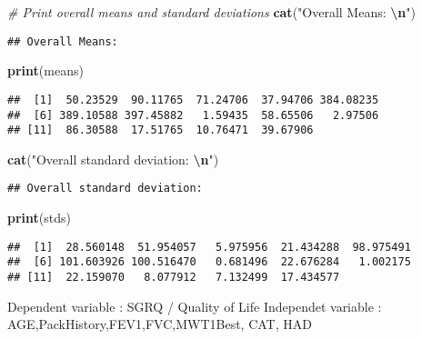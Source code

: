 \documentclass[
]{article}
\newenvironment{Shaded}{\begin{snugshade}}{\end{snugshade}}
\newcommand{\CommentTok}[1]{\textcolor[rgb]{0.56,0.35,0.01}{\textit{#1}}}
\newcommand{\FunctionTok}[1]{\textcolor[rgb]{0.13,0.29,0.53}{\textbf{#1}}}
\newcommand{\NormalTok}[1]{#1}
\newcommand{\SpecialCharTok}[1]{\textcolor[rgb]{0.81,0.36,0.00}{\textbf{#1}}}
\newcommand{\StringTok}[1]{\textcolor[rgb]{0.31,0.60,0.02}{#1}}
\begin{document}
\begin{Shaded}
\begin{Highlighting}[]
\CommentTok{\# Print overall means and standard deviations}
\FunctionTok{cat}\NormalTok{(}\StringTok{"Overall Means: }\SpecialCharTok{\textbackslash{}n}\StringTok{"}\NormalTok{)}
\end{Highlighting}
\end{Shaded}

\begin{verbatim}
## Overall Means:
\end{verbatim}

\begin{Shaded}
\begin{Highlighting}[]
\FunctionTok{print}\NormalTok{(means)}
\end{Highlighting}
\end{Shaded}

\begin{verbatim}
##  [1]  50.23529  90.11765  71.24706  37.94706 384.08235
##  [6] 389.10588 397.45882   1.59435  58.65506   2.97506
## [11]  86.30588  17.51765  10.76471  39.67906
\end{verbatim}

\begin{Shaded}
\begin{Highlighting}[]
\FunctionTok{cat}\NormalTok{(}\StringTok{"Overall standard deviation: }\SpecialCharTok{\textbackslash{}n}\StringTok{"}\NormalTok{)}
\end{Highlighting}
\end{Shaded}

\begin{verbatim}
## Overall standard deviation:
\end{verbatim}

\begin{Shaded}
\begin{Highlighting}[]
\FunctionTok{print}\NormalTok{(stds)}
\end{Highlighting}
\end{Shaded}

\begin{verbatim}
##  [1]  28.560148  51.954057   5.975956  21.434288  98.975491
##  [6] 101.603926 100.516470   0.681496  22.676284   1.002175
## [11]  22.159070   8.077912   7.132499  17.434577
\end{verbatim}

Dependent variable : SGRQ / Quality of Life Independet variable :
AGE,PackHistory,FEV1,FVC,MWT1Best, CAT, HAD
\end{document}
